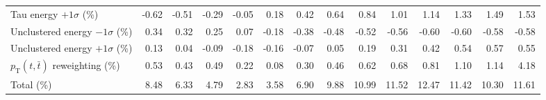 \begin{table}[htbp]
{\begin{tabular}{lrrrrrrrrrrrrr}
Tau energy $+1\sigma$ (\%) & -0.62 & -0.51 & -0.29 & -0.05 & 0.18 & 0.42 & 0.64 & 0.84 & 1.01 & 1.14 & 1.33 & 1.49 & 1.53 \\ 
Unclustered energy $-1\sigma$ (\%) & 0.34 & 0.32 & 0.25 & 0.07 & -0.18 & -0.38 & -0.48 & -0.52 & -0.56 & -0.60 & -0.60 & -0.58 & -0.58 \\ 
Unclustered energy $+1\sigma$ (\%) & 0.13 & 0.04 & -0.09 & -0.18 & -0.16 & -0.07 & 0.05 & 0.19 & 0.31 & 0.42 & 0.54 & 0.57 & 0.55 \\ 
$p_\mathrm{T}(t,\bar{t})$ reweighting (\%) & 0.53 & 0.43 & 0.49 & 0.22 & 0.08 & 0.30 & 0.46 & 0.62 & 0.68 & 0.81 & 1.10 & 1.14 & 4.18 \\ 
\hline 
Total (\%) & 8.48  & 6.33  & 4.79  & 2.83  & 3.58  & 6.90  & 9.88  & 10.99  & 11.52  & 12.47  & 11.42  & 10.30  & 11.61 \\ 
\hline 
\end{tabular}
}
\end{table}
